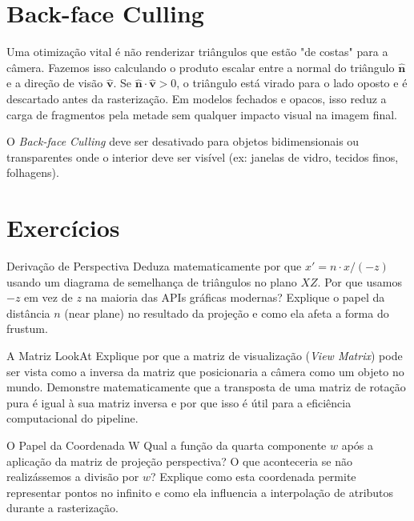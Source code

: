 \section{Back-face Culling}

Uma otimização vital é não renderizar triângulos que estão "de costas" para a câmera. Fazemos isso calculando o produto escalar entre a normal do triângulo $\hat{\mathbf{n}}$ e a direção de visão $\hat{\mathbf{v}}$. Se $\hat{\mathbf{n}} \cdot \hat{\mathbf{v}} > 0$, o triângulo está virado para o lado oposto e é descartado antes da rasterização. Em modelos fechados e opacos, isso reduz a carga de fragmentos pela metade sem qualquer impacto visual na imagem final.

\begin{aviso}
    O \textit{Back-face Culling} deve ser desativado para objetos bidimensionais ou transparentes onde o interior deve ser visível (ex: janelas de vidro, tecidos finos, folhagens).
\end{aviso}

\section*{Exercícios}

\begin{exercicio}{Derivação de Perspectiva}
    Deduza matematicamente por que $x' = n \cdot x / (-z)$ usando um diagrama de semelhança de triângulos no plano $XZ$. Por que usamos $-z$ em vez de $z$ na maioria das APIs gráficas modernas? Explique o papel da distância $n$ (near plane) no resultado da projeção e como ela afeta a forma do frustum.
\end{exercicio}

\begin{exercicio}{A Matriz LookAt}
    Explique por que a matriz de visualização (\textit{View Matrix}) pode ser vista como a inversa da matriz que posicionaria a câmera como um objeto no mundo. Demonstre matematicamente que a transposta de uma matriz de rotação pura é igual à sua matriz inversa e por que isso é útil para a eficiência computacional do pipeline.
\end{exercicio}

\begin{exercicio}{O Papel da Coordenada W}
    Qual a função da quarta componente $w$ após a aplicação da matriz de projeção perspectiva? O que aconteceria se não realizássemos a divisão por $w$? Explique como esta coordenada permite representar pontos no infinito e como ela influencia a interpolação de atributos durante a rasterização.
\end{exercicio}

